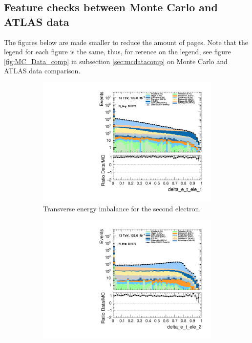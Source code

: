 \subsection*{Feature checks between Monte Carlo and ATLAS data}
The figures below are made smaller to reduce the amount of pages. Note that the legend for each figure is 
the same, thus, for rerence on the legend, see figure \ref{fig:MC_Data_comp} in subsection \ref{sec:mcdatacomp} 
on Monte Carlo and ATLAS data comparison.
\begin{figure}
    \centering
    \begin{subfigure}{.49\textwidth}
        \includegraphics[width=\textwidth]{Figures/MC_Data_comp/delta_e_t_ele_1.pdf}
        \caption{Transverse energy imbalance for the second electron.}
        \label{fig:delta_e_t_ele_1}
    \end{subfigure}
    \hfill
    \begin{subfigure}{.49\textwidth}
        \includegraphics[width=\textwidth]{Figures/MC_Data_comp/delta_e_t_ele_2.pdf}

\end{subfigure}
\end{figure}
